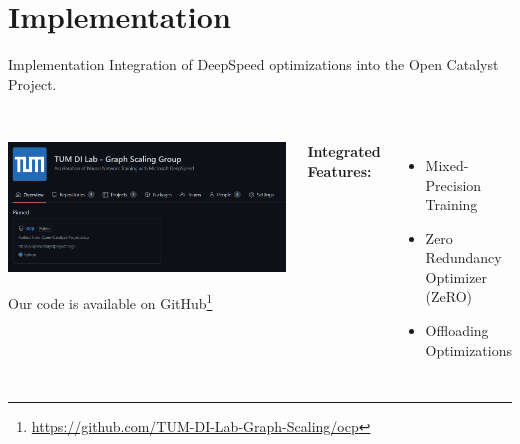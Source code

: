 \section{Implementation}

\begin{frame}{Implementation}
    Integration of DeepSpeed optimizations into the Open Catalyst Project. \\~\\ 

    \begin{columns}

        \begin{center}
            \includegraphics[scale=0.22]{figures/ocp-branch.png}

            Our code is available on GitHub\footnote{\url{https://github.com/TUM-DI-Lab-Graph-Scaling/ocp}}
        \end{center} 
        

        \textbf{Integrated Features:}

        \begin{itemize}
            \item \textcolor{green}{} Mixed-Precision Training
            \item \textcolor{green}{} Zero Redundancy Optimizer (ZeRO)
            \item \textcolor{green}{} Offloading Optimizations
        \end{itemize}
    \end{columns}
\end{frame}

